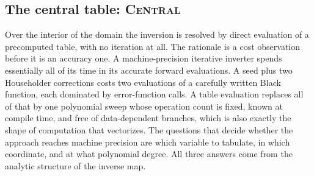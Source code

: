 \documentclass[11pt]{article}
\newcommand{\rtag}[1]{{\normalfont\scshape #1}}
\begin{document}
\subsection{The central table: \rtag{Central}}
\label{sec:table}

Over the interior of the domain the inversion is resolved by direct evaluation of a precomputed table, with no iteration at all. The rationale is a cost observation before it is an accuracy one. A machine-precision iterative inverter spends essentially all of its time in its accurate forward evaluations. A seed plus two Householder corrections costs two evaluations of a carefully written Black function, each dominated by error-function calls. A table evaluation replaces all of that by one polynomial sweep whose operation count is fixed, known at compile time, and free of data-dependent branches, which is also exactly the shape of computation that vectorizes. The questions that decide whether the approach reaches machine precision are which variable to tabulate, in which coordinate, and at what polynomial degree. All three answers come from the analytic structure of the inverse map.
\end{document}
